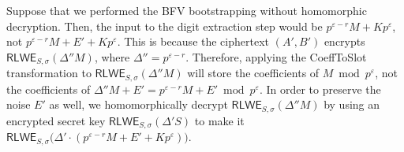  Suppose that we performed the BFV bootstrapping without homomorphic decryption. Then, the input to the digit extraction step would be $p^{\varepsilon-r}M + Kp^\varepsilon$, not $p^{\varepsilon-r}M + E' + Kp^\varepsilon$. This is because the ciphertext $(A', B')$ encrypts $\textsf{RLWE}_{S,\sigma}(\Delta'' M)$, where $\Delta'' = p^{\varepsilon-r}$. Therefore, applying the \textsf{CoeffToSlot} transformation to $\textsf{RLWE}_{S,\sigma}(\Delta'' M)$ will store the coefficients of $M \bmod p^\varepsilon$, not the coefficients of $\Delta'' M + E' = p^{\varepsilon-r}M + E' \bmod p^\varepsilon$. In order to preserve the noise $E'$ as well, we homomorphically decrypt $\textsf{RLWE}_{S,\sigma}(\Delta'' M)$ by using an encrypted secret key $\textsf{RLWE}_{S, \sigma}(\Delta' S)$ to make it $\textsf{RLWE}_{S,\sigma}\bm(\Delta' \cdot (p^{\varepsilon-r}M + E' + Kp^\varepsilon) \bm)$. 

